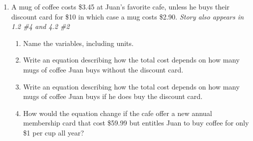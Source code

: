 \begin{enumerate}
\item  A mug of coffee costs \$3.45 at Juan's favorite cafe, unless he buys their discount card for \$10 in which case a mug costs  \$2.90.
    \hfill \emph{Story also appears in 1.2 \#4 and 4.2 \#2}
\begin{enumerate}
\item Name the variables, including units. \vfill
\item Write an equation describing how the total cost depends on how many mugs of coffee Juan buys without the discount card. \vfill
\item Write an equation describing how the total cost depends on how many mugs of coffee Juan buys if he does buy the discount card. \vfill
\item How would the equation change if the cafe offer a new annual membership card that cost \$59.99 but entitles Juan to buy coffee for only \$1 per cup all year? \vfill
\end{enumerate} 

\end{enumerate}